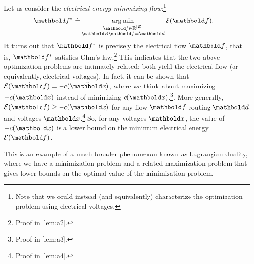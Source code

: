 Let us consider the \emph{electrical energy-minimizing flow}:\footnote{Note that we could instead (and equivalently) characterize the optimization problem using electrical voltages.} \begin{align}
    \s{\vf} \defeq &\argmin_{\substack{\vf \in \R^{|\sE|} \\ \mB\vf = \vd}} \e(\vf). \label{eq:electrical_energy_minimizing_flow}
\end{align} It turns out that $\s{\vf}$ is precisely the electrical flow $\ef$, that is, $\s{\vf}$ satisfies Ohm's law.\footnote{Proof in \cref{lem:a2}.} This indicates that the two above optimization problems are intimately related: both yield the electrical flow (or equivalently, electrical voltages). In fact, it can be shown that $\e(\ef) = -c(\elx)$, where we think about maximizing $-c(\vx)$ instead of minimizing $c(\vx)$.\footnote{Proof in \cref{lem:a3}.}. More generally, $\e(\vf) \geq -c(\vx)$ for any flow $\vf$ routing $\vd$ and voltages $\vx$.\footnote{Proof in \cref{lem:a4}.} So, for any voltages $\vx$, the value of $-c(\vx)$ is a lower bound on the minimum electrical energy $\e(\ef)$.

This is an example of a much broader phenomenon known as Lagrangian duality, where we have a minimization problem and a related maximization problem that gives lower bounds on the optimal value of the minimization problem.